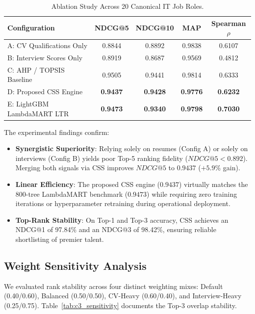 \documentclass[conference]{IEEEtran}
\begin{document}
\begin{table}[htbp]
\caption{Ablation Study Across 20 Canonical IT Job Roles.}
\begin{center}
\begin{tabular}{lcccc}
\toprule
\textbf{Configuration} & \textbf{NDCG@5} & \textbf{NDCG@10} & \textbf{MAP} & \textbf{Spearman $\rho$} \\
\midrule
A: CV Qualifications Only  & 0.8844 & 0.8892 & 0.9838 & 0.6107 \\
B: Interview Scores Only   & 0.8919 & 0.8687 & 0.9569 & 0.4812 \\
C: AHP / TOPSIS Baseline   & 0.9505 & 0.9441 & 0.9814 & 0.6333 \\
D: Proposed CSS Engine     & \textbf{0.9437} & \textbf{0.9428} & \textbf{0.9776} & \textbf{0.6232} \\
E: LightGBM LambdaMART LTR & \textbf{0.9473} & \textbf{0.9340} & \textbf{0.9798} & \textbf{0.7030} \\
\bottomrule
\end{tabular}
\label{tab:c3_ablation_study}
\end{center}
\end{table}

The experimental findings confirm:
\begin{itemize}
    \item \textbf{Synergistic Superiority}: Relying solely on resumes (Config A) or solely on interviews (Config B) yields poor Top-5 ranking fidelity ($NDCG@5 < 0.892$). Merging both signals via CSS improves $NDCG@5$ to $0.9437$ ($+5.9\%$ gain).
    \item \textbf{Linear Efficiency}: The proposed CSS engine ($0.9437$) virtually matches the 800-tree LambdaMART benchmark ($0.9473$) while requiring zero training iterations or hyperparameter retraining during operational deployment.
    \item \textbf{Top-Rank Stability}: On Top-1 and Top-3 accuracy, CSS achieves an NDCG@1 of 97.84\% and an NDCG@3 of 98.42\%, ensuring reliable shortlisting of premier talent.
\end{itemize}

\subsection{Weight Sensitivity Analysis}
We evaluated rank stability across four distinct weighting mixes: Default (0.40/0.60), Balanced (0.50/0.50), CV-Heavy (0.60/0.40), and Interview-Heavy (0.25/0.75). Table~\ref{tab:c3_sensitivity} documents the Top-3 overlap stability.
\end{document}

